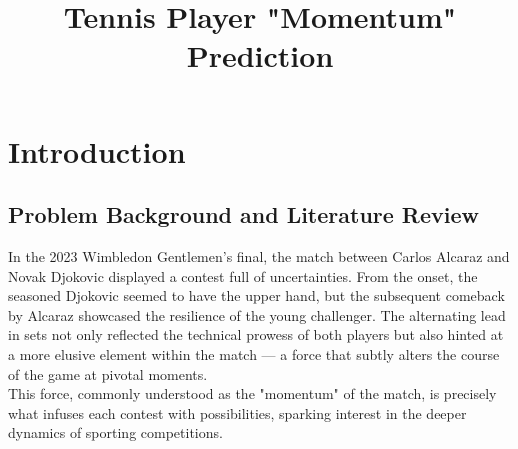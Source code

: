 \documentclass{mcmthesis}
\title{Tennis Player "Momentum" Prediction}
\begin{document}
\begin{abstract}

\begin{keywords}

\end{keywords}
\end{abstract}
\maketitle
 \tableofcontents
 \newpage



\section{Introduction}

\subsection{Problem Background and Literature Review}
\hspace*{1em} In the 2023 Wimbledon Gentlemen's final, the match between Carlos Alcaraz and Novak Djokovic %
displayed a contest full of uncertainties. From the onset, the seasoned Djokovic seemed to have the upper hand, %
but the subsequent comeback by Alcaraz showcased the resilience of the young challenger. %
The alternating lead in sets not only reflected the technical prowess of both players but also hinted at %
a more elusive element within the match --- a force that subtly alters the course of the game at pivotal moments. \\
\hspace*{1em} This force, commonly understood as the "momentum" of the match, is precisely what infuses each contest %
with possibilities, sparking interest in the deeper dynamics of sporting competitions.
\end{document}
